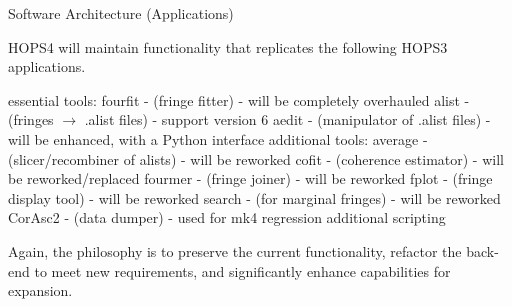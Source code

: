 \documentclass[8pt]{beamer}
\begin{document}
\begin{frame}{Software Architecture (Applications)}



HOPS4 will maintain functionality that replicates the following HOPS3 applications.
\begin{outline}
  \1 essential tools:
  \2 fourfit - (fringe fitter) - will be completely overhauled
  \2 alist - (fringes $\rightarrow$ .alist files) - support version 6
  \2 aedit - (manipulator of .alist files) - will be enhanced, with a Python interface
  \1 additional tools:
  \2 average - (slicer/recombiner of alists) - will be reworked
  \2 cofit - (coherence estimator) - will be reworked/replaced
  \2 fourmer - (fringe joiner) - will be reworked
  \2 fplot - (fringe display tool) - will be reworked
  \2 search - (for marginal fringes) - will be reworked
  \2 CorAsc2 - (data dumper) - used for mk4 regression
  \1 additional scripting
\end{outline}
Again, the philosophy is to preserve the current functionality, refactor the back-end to meet new requirements, and significantly enhance capabilities for expansion.
\end{frame}
\end{document}
